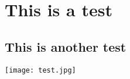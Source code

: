 \section{This is a test}
\lipsum

\subsection{This is another test}
\texttt{[image: test.jpg]}
\lipsum
